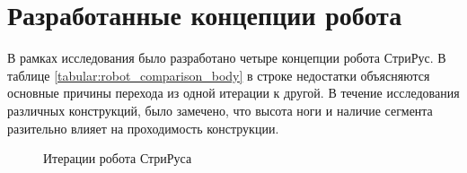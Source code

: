 \section{Разработанные концепции робота}

В рамках исследования было разработано четыре концепции робота СтриРус. В таблице \ref{tabular:robot_comparison_body} в строке недостатки объясняются основные причины перехода из одной итерации к другой. В течение исследования различных конструкций, было замечено, что высота ноги и наличие сегмента разительно влияет на проходимость конструкции. \quad {}

\begin{figure}[H]
    \caption{Итерации робота СтриРуса}\label{fig:striruses}
  \end{figure}

